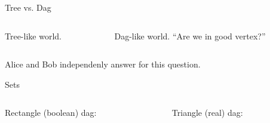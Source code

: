 \begin{frame}{Tree vs. Dag}

	\begin{columns}[t]
		\begin{column}{0.52\textwidth}
            \begin{center}
                Tree-like world.
                \vspace{0.2cm}
                
            \end{center}
        \end{column}

        \pause
		\begin{column}{0.48\textwidth}
            \begin{center}
                Dag-like world. ``Are we in good vertex?''
                \vspace{0.2cm}
                
            \end{center}
		\end{column}
	\end{columns}

    \pause
    \pause
    \vspace{0.4cm}
    Alice and Bob independenly answer for this question.
\end{frame}

\begin{frame}{Sets}
    \begin{columns}[t]
		\begin{column}{0.48\textwidth}
            \begin{center}
                Rectangle (boolean) dag:
                \vspace{0.2cm}
                
            \end{center}
        \end{column}

		\begin{column}{0.48\textwidth}
            \begin{center}
                Triangle (real) dag:
                \vspace{0.2cm}
                
            \end{center}
		\end{column}
	\end{columns}
\end{frame}


